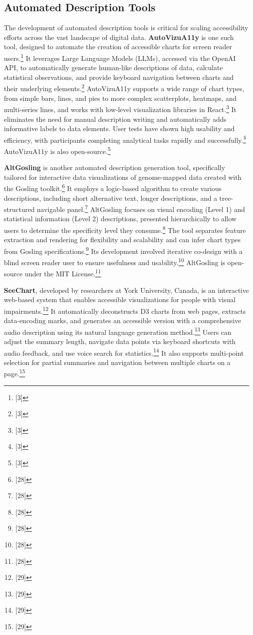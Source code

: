 \subsection{Automated Description Tools}
The development of automated description tools is critical for scaling accessibility efforts across the vast landscape of digital data. \textbf{AutoVizuA11y} is one such tool, designed to automate the creation of accessible charts for screen reader users.\footnote{[3]} It leverages Large Language Models (LLMs), accessed via the OpenAI API, to automatically generate human-like descriptions of data, calculate statistical observations, and provide keyboard navigation between charts and their underlying elements.\footnote{[3]} AutoVizuA11y supports a wide range of chart types, from simple bars, lines, and pies to more complex scatterplots, heatmaps, and multi-series lines, and works with low-level visualization libraries in React.\footnote{[3]} It eliminates the need for manual description writing and automatically adds informative labels to data elements. User tests have shown high usability and efficiency, with participants completing analytical tasks rapidly and successfully.\footnote{[3]} AutoVizuA11y is also open-source.\footnote{[3]}

\textbf{AltGosling} is another automated description generation tool, specifically tailored for interactive data visualizations of genome-mapped data created with the Gosling toolkit.\footnote{[28]} It employs a logic-based algorithm to create various descriptions, including short alternative text, longer descriptions, and a tree-structured navigable panel.\footnote{[28]} AltGosling focuses on visual encoding (Level 1) and statistical information (Level 2) descriptions, presented hierarchically to allow users to determine the specificity level they consume.\footnote{[28]} The tool separates feature extraction and rendering for flexibility and scalability and can infer chart types from Gosling specifications.\footnote{[28]} Its development involved iterative co-design with a blind screen reader user to ensure usefulness and usability.\footnote{[28]} AltGosling is open-source under the MIT License.\footnote{[28]}

\textbf{SeeChart}, developed by researchers at York University, Canada, is an interactive web-based system that enables accessible visualizations for people with visual impairments.\footnote{[29]} It automatically deconstructs D3 charts from web pages, extracts data-encoding marks, and generates an accessible version with a comprehensive audio description using its natural language generation method.\footnote{[29]} Users can adjust the summary length, navigate data points via keyboard shortcuts with audio feedback, and use voice search for statistics.\footnote{[29]} It also supports multi-point selection for partial summaries and navigation between multiple charts on a page.\footnote{[29]}

